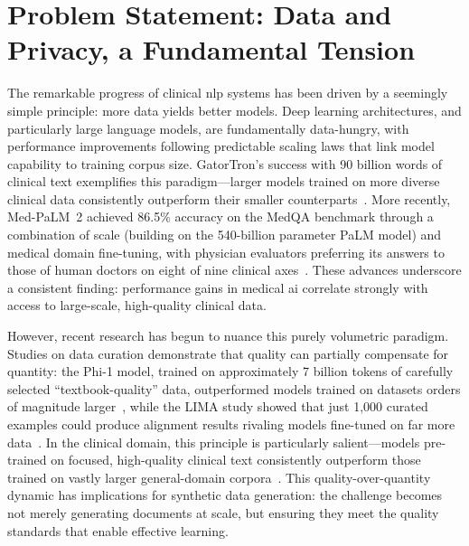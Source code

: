 \section{Problem Statement: Data and Privacy, a Fundamental Tension}

The remarkable progress of clinical \gls{nlp} systems has been driven by a seemingly simple principle: more data yields better models. Deep learning architectures, and particularly large language models, are fundamentally data-hungry, with performance improvements following predictable scaling laws that link model capability to training corpus size. GatorTron's success with 90 billion words of clinical text exemplifies this paradigm---larger models trained on more diverse clinical data consistently outperform their smaller counterparts~\citep{yang2022large}. More recently, Med-PaLM~2 achieved 86.5\% accuracy on the MedQA benchmark through a combination of scale (building on the 540-billion parameter PaLM model) and medical domain fine-tuning, with physician evaluators preferring its answers to those of human doctors on eight of nine clinical axes~\citep{singhal2023medpalm2}. These advances underscore a consistent finding: performance gains in medical \gls{ai} correlate strongly with access to large-scale, high-quality clinical data.

However, recent research has begun to nuance this purely volumetric paradigm.
Studies on data curation demonstrate that quality can partially compensate for quantity: the Phi-1 model, trained on approximately 7 billion tokens of carefully selected ``textbook-quality'' data, outperformed models trained on datasets orders of magnitude larger~\citep{gunasekar2023textbooks}, while the LIMA study showed that just 1,000 curated examples could produce alignment results rivaling models fine-tuned on far more data~\citep{zhou2023lima}.
In the clinical domain, this principle is particularly salient---models pre-trained on focused, high-quality clinical text consistently outperform those trained on vastly larger general-domain corpora~\citep{gu2021domain}.
This quality-over-quantity dynamic has implications for synthetic data generation: the challenge becomes not merely generating documents at scale, but ensuring they meet the quality standards that enable effective learning.

